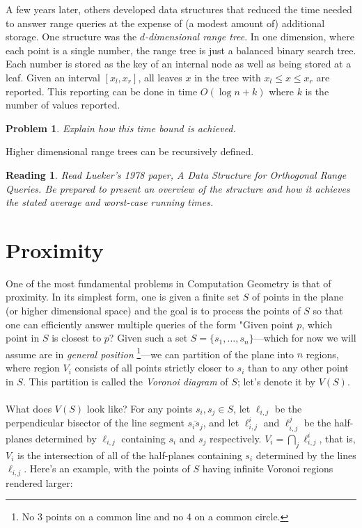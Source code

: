 \documentclass[11pt]{article}
\newtheorem{problem}{Problem}
\newtheorem{reading}{Reading}
\begin{document}
A few years later, others developed data structures that reduced the time needed to answer range queries at the expense of (a modest amount of) additional storage. One structure was the {\em $d$-dimensional range tree}.  In one dimension,
where each point is a single number, the range tree is just a balanced binary search tree.  Each number is stored as the key of an internal node as well as being stored at a leaf. Given an interval $[x_l, x_r]$, all leaves $x$ in the tree with
$x_l \leq x \leq x_r$ are reported. This reporting can be done in time $O(\log n + k)$ where $k$ is the number of values
reported.

\begin{problem}
Explain how this time bound is achieved.
\end{problem}

Higher dimensional range trees can be recursively defined.

\begin{reading}
Read Lueker's 1978 paper, {\em A Data Structure for Orthogonal Range Queries}. Be prepared to present an overview
of the structure and how it achieves the stated average and worst-case running times.
\end{reading}

\section{Proximity}
One of the most fundamental problems in Computation Geometry is that of proximity. In its simplest form, one is given
a finite set $S$ of points in the plane (or higher dimensional space) and the goal is to process the points of $S$ so that one can efficiently answer multiple queries of the form "Given point $p$, which point in $S$ is closest to $p$?
Given such a set $S = \{s_1, \ldots, s_n\}$---which for now we will assume are in {\em general position}
\footnote{No 3 points on a common line and no 4 on a common circle.}---we can partition of the plane into $n$ regions,
where region $V_i$ consists of all points strictly closer to $s_i$ than to any other point in $S$.
This partition is called the {\em Voronoi diagram} of $S$; let's denote it by $V(S)$.
\\
\\
What does $V(S)$ look like? For any points $s_i, s_j\in S$, let $\ell_{i,j}$ be the perpendicular bisector of the line segment
$\overline{s_i s_j}$, and let $\ell^i_{i,j}$ and $\ell^j_{i,j}$ be the half-planes determined by $\ell_{i,j}$ containing $s_i$
and $s_j$ respectively.  $V_i = \bigcap_j \ell^i_{i,j}$, that is, $V_i$ is the intersection of all of the half-planes containing
$s_i$ determined by the lines $\ell_{i,j}$.  Here's an example, with the points of $S$ having infinite Voronoi regions
rendered larger:
\end{document}
